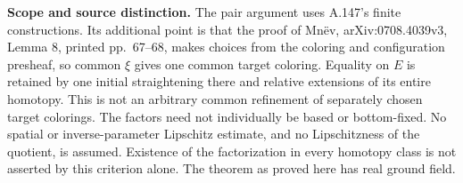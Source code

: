 \textbf{Scope and source distinction.}
The pair argument uses A.147's finite constructions. Its additional
point is that the proof of Mn\"ev, arXiv:0708.4039v3, Lemma 8,
printed pp.~67--68, makes choices from the coloring and configuration
presheaf, so common \(\xi\) gives one common target coloring.
Equality on \(E\) is retained by one initial straightening there and
relative extensions of its entire homotopy. This is not an arbitrary
common refinement of separately chosen target colorings.
The factors need not individually be based or bottom-fixed.
No spatial or inverse-parameter Lipschitz estimate, and no
Lipschitzness of the quotient, is assumed. Existence of the
factorization in every homotopy class is not asserted by this
criterion alone. The theorem as proved here has real ground field.

